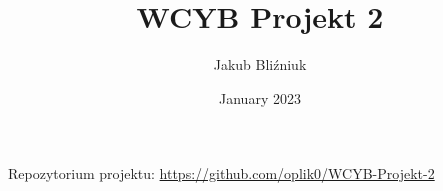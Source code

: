 \documentclass{report}
\title{WCYB Projekt 2}
\author{Jakub Bliźniuk}
\date{January 2023}
\numberwithin{equation}{section}
\begin{document}
\pagestyle{fancy}
\fancyfoot{}
\fancyfoot[C]{\thepage}

\begin{titlepage}
    \vfill
    \maketitle
    \thispagestyle{fancy}
\end{titlepage}
\tableofcontents
\thispagestyle{fancy}
\setcounter{chapter}{4}
\begin{center}
    Repozytorium projektu: \url{https://github.com/oplik0/WCYB-Projekt-2}
\end{center}


\end{document}
